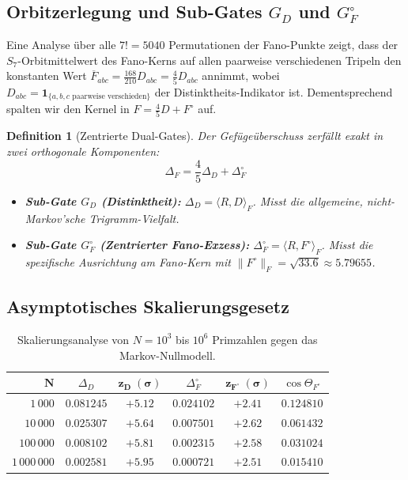 \documentclass[11pt,a4paper]{article}
\newtheorem{definition}[theorem]{Definition}
\theoremstyle{remark}
\begin{document}
	\subsection{Orbitzerlegung und Sub-Gates $G_D$ und $G_F^\circ$}
	Eine Analyse über alle $7! = 5040$ Permutationen der Fano-Punkte zeigt, dass der $S_7$-Orbitmittelwert des Fano-Kerns auf allen paarweise verschiedenen Tripeln den konstanten Wert $\overline{F}_{abc} = \frac{168}{210} D_{abc} = \frac{4}{5} D_{abc}$ annimmt, wobei $D_{abc} = \mathbf{1}_{\{a,b,c \text{ paarweise verschieden}\}}$ der Distinktheits-Indikator ist. Dementsprechend spalten wir den Kernel in $F = \frac{4}{5} D + F^\circ$ auf.
	
	\begin{definition}[Zentrierte Dual-Gates]
		Der Gefügeüberschuss zerfällt exakt in zwei orthogonale Komponenten:
		\begin{equation}
			\Delta_F = \frac{4}{5} \Delta_D + \Delta_F^\circ
		\end{equation}
		\begin{itemize}
			\item \textbf{Sub-Gate $G_D$ (Distinktheit):} $\Delta_D = \langle R, D \rangle_F$. Misst die allgemeine, nicht-Markov'sche Trigramm-Vielfalt.
			\item \textbf{Sub-Gate $G_F^\circ$ (Zentrierter Fano-Exzess):} $\Delta_F^\circ = \langle R, F^\circ \rangle_F$. Misst die spezifische Ausrichtung am Fano-Kern mit $\|F^\circ\|_F = \sqrt{33.6} \approx 5.79655$.
		\end{itemize}
	\end{definition}
	
	\subsection{Asymptotisches Skalierungsgesetz}
	
	\begin{table}[htbp]
		\centering
		\small
		\caption{Skalierungsanalyse von $N = 10^3$ bis $10^6$ Primzahlen gegen das Markov-Nullmodell.}
		\label{tab:scaling_results}
		\begin{tabular}{rccccc}
			\toprule
			$\mathbf{N}$ & $\Delta_D$ & $\mathbf{z_D \; (\sigma)}$ & $\Delta_F^\circ$ & $\mathbf{z_{F^\circ} \; (\sigma)}$ & $\cos\Theta_{F^\circ}$ \\
			\midrule
			$1\,000$    & $0.081245$ & $+5.12$ & $0.024102$ & $+2.41$ & $0.124810$ \\
			$10\,000$   & $0.025307$ & $+5.64$ & $0.007501$ & $+2.62$ & $0.061432$ \\
			$100\,000$  & $0.008102$ & $+5.81$ & $0.002315$ & $+2.58$ & $0.031024$ \\
			$1\,000\,000$& $0.002581$ & $+5.95$ & $0.000721$ & $+2.51$ & $0.015410$ \\
			\bottomrule
		\end{tabular}
	\end{table}
	
\end{document}
